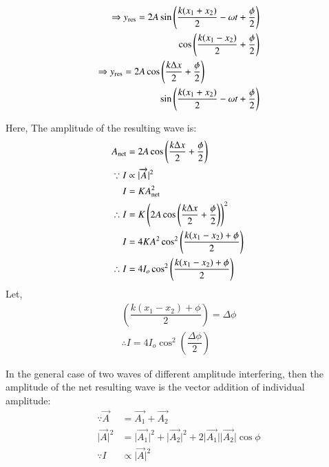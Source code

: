 \documentclass[journal,12pt,twocolumn]{IEEEtran}
\theoremstyle{remark}
\begin{document}
\begin{align}
\Rightarrow y_\text{res} =  2A\sin\left(\dfrac{k(x_1+x_2)}{2} - \omega t+\dfrac{\phi}{2}\right) \nonumber \\
\quad\cos\left(\dfrac{k(x_1 - x_2)}{2} + \dfrac{\phi}{2}\right) \\
 \Rightarrow y_\text{res} =  2A\cos\left(\dfrac{k\Delta x}{2} + \dfrac{\phi}{2}\right) \nonumber \hspace*{2cm} \\ \quad \sin\left(\dfrac{k(x_1+x_2)}{2} - \omega t+\dfrac{\phi}{2}\right) 
 \end{align}

Here,
The amplitude of the resulting wave is: 
\begin{align}\hspace*{-2cm}
A_\text{net} &= 2A\cos\left(\dfrac{k\Delta x}{2} + \dfrac{\phi}{2}\right)  \\ 
\because I &\propto \lvert\overrightarrow{A}\rvert^2  \nonumber \\
I &= KA^2_\text{net} \\
\therefore I &= K\left(2A\cos\left(\dfrac{k\Delta x}{2} + \dfrac{\phi}{2}\right)\right)^2 \\
I &= 4KA^2\cos^2\left(\dfrac{k(x_1 - x_2) + \phi}{2}\right) \\
\therefore I &= 4I_o\cos^2\left(\dfrac{k(x_1 - x_2) + \phi}{2}\right) 
\end{align}
Let, 
\begin{align}
    \left(\dfrac{k(x_1 - x_2) + \phi}{2}\right) = \Delta \phi  \\
\therefore I  = 4I_o\cos^2\left(\dfrac{\Delta \phi}{2}\right) 
\end{align}



In the general case of two waves of different amplitude interfering, then the amplitude of the net resulting wave is the vector addition of individual amplitude: \\
\hspace{0.8cm} 
\begin{align}
 \because \overrightarrow{A} &= \overrightarrow{A_1} + \overrightarrow{A_2} \nonumber \\
 \lvert \overrightarrow{A} \rvert^2 &= \lvert\overrightarrow{A_1}\rvert^2 +\lvert \overrightarrow{A_2}\rvert^2 + 2\lvert\overrightarrow{A_1}\rvert\lvert\overrightarrow{A_2}\rvert \cos \phi  \\
\because I &\propto \lvert\overrightarrow{A}\rvert^2 
\end{align}
\end{document}

